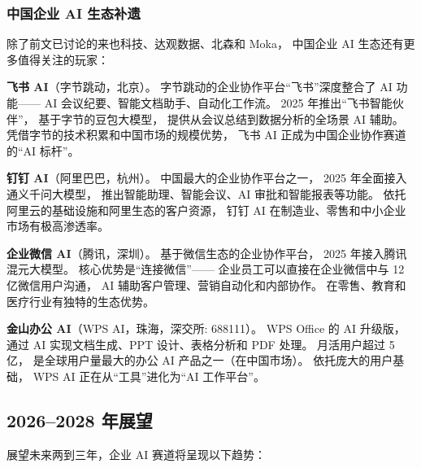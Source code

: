 \subsubsection{中国企业 AI 生态补遗}

除了前文已讨论的来也科技、达观数据、北森和 Moka，
中国企业 AI 生态还有更多值得关注的玩家：

\textbf{飞书 AI}（字节跳动，北京）。
字节跳动的企业协作平台``飞书''深度整合了 AI 功能——
AI 会议纪要、智能文档助手、自动化工作流。
2025 年推出``飞书智能伙伴''，
基于字节的豆包大模型，
提供从会议总结到数据分析的全场景 AI 辅助。
凭借字节的技术积累和中国市场的规模优势，
飞书 AI 正成为中国企业协作赛道的``AI 标杆''。

\textbf{钉钉 AI}（阿里巴巴，杭州）。
中国最大的企业协作平台之一，
2025 年全面接入通义千问大模型，
推出智能助理、智能会议、AI 审批和智能报表等功能。
依托阿里云的基础设施和阿里生态的客户资源，
钉钉 AI 在制造业、零售和中小企业市场有极高渗透率。

\textbf{企业微信 AI}（腾讯，深圳）。
基于微信生态的企业协作平台，
2025 年接入腾讯混元大模型。
核心优势是``连接微信''——
企业员工可以直接在企业微信中与 12 亿微信用户沟通，
AI 辅助客户管理、营销自动化和内部协作。
在零售、教育和医疗行业有独特的生态优势。

\textbf{金山办公 AI}（WPS AI，珠海，深交所: 688111）。
WPS Office 的 AI 升级版，
通过 AI 实现文档生成、PPT 设计、表格分析和 PDF 处理。
月活用户超过 5 亿，
是全球用户量最大的办公 AI 产品之一（在中国市场）。
依托庞大的用户基础，
WPS AI 正在从``工具''进化为``AI 工作平台''。

\subsection{2026--2028 年展望}

展望未来两到三年，企业 AI 赛道将呈现以下趋势：

